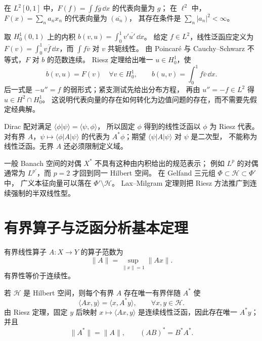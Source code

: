 \begin{example}
在 $L^2[0,1]$ 中，$F(f)=\int f\overline g\,\dd x$ 的代表向量为 $g$；
在 $\ell^2$ 中，$F(x)=\sum_n a_nx_n$ 的代表向量为 $(\overline{a_n})$，
其存在条件是 $\sum_n|a_n|^2<\infty$。

取 $H_0^1(0,1)$ 上的内积
$b(v,u)=\int_0^1 v'\overline{u'}\,\dd x$。
给定 $f\in L^2$，线性泛函应定义为
$F(v)=\int_0^1v\overline f\,\dd x$，而 $\int f\overline v$ 对 $v$ 共轭线性。
由 Poincaré 与 Cauchy--Schwarz 不等式，$F$ 对 $b$ 的范数连续。
Riesz 定理给出唯一 $u\in H_0^1$，使
\[
b(v,u)=F(v)\quad\forall v\in H_0^1,
\qquad
b(u,v)=\int_0^1 f\overline v\,\dd x.
\]
后一式是 $-u''=f$ 的弱形式；紧支测试先给出分布方程，
再由 $u''=-f\in L^2$ 得 $u\in H^2\cap H_0^1$。
这说明代表向量的存在如何转化为边值问题的存在，而不需要先假定经典解。
\end{example}

\begin{note}
Dirac 配对满足 $\langle\phi|\psi\rangle=\langle\psi,\phi\rangle$，
所以固定 $\phi$ 得到的线性泛函以 $\phi$ 为 Riesz 代表。
对有界 $A$，$\psi\mapsto\langle\phi|A|\psi\rangle$
的代表为 $A^*\phi$；期望 $\langle\psi|A|\psi\rangle$ 对 $\psi$ 是二次型，
不能称为线性泛函。无界 $A$ 还必须限制定义域。

一般 Banach 空间的对偶 $X^*$ 不具有这种由内积给出的规范表示；
例如 $L^p$ 的对偶通常为 $L^{p'}$，而 $p=2$ 才回到同一 Hilbert 空间。
在 Gelfand 三元组 $\Phi\subset\mathcal H\subset\Phi'$ 中，
广义本征向量可以落在 $\Phi'\setminus\mathcal H$。
Lax--Milgram 定理则把 Riesz 方法推广到连续强制的半双线性型。
\end{note}

\section{有界算子与泛函分析基本定理}
\begin{definition}[有界算子与算子范数]
有界线性算子 $A:X\to Y$ 的算子范数为
\[
\|A\|=\sup_{\|x\|=1}\|Ax\|.
\]
有界性等价于连续性。
\end{definition}

\begin{proposition}[有界算子的伴随]
若 $\mathcal H$ 是 Hilbert 空间，则每个有界 $A$ 存在唯一有界伴随 $A^*$ 使
\[
\boxed{\langle Ax,y\rangle=\langle x,A^*y\rangle},
\qquad \forall x,y\in\mathcal H.
\]
由 Riesz 定理，固定 $y$ 后映射 $x\mapsto\langle Ax,y\rangle$ 是连续线性泛函，因此存在唯一 $A^*y$；并且
\[
\|A^*\|=\|A\|,
\qquad
(AB)^*=B^*A^*.
\]
\end{proposition}

